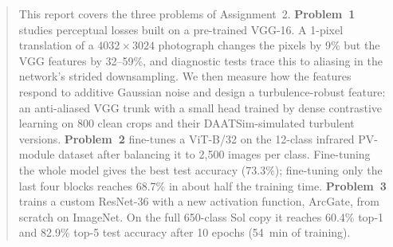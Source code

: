 \begin{abstract}
This report covers the three problems of Assignment~2.
\textbf{Problem~1} studies perceptual losses built on a pre-trained VGG-16.
A 1-pixel translation of a $4032\times3024$ photograph changes the pixels by 9\% but the VGG features by 32--59\%, and diagnostic tests trace this to aliasing in the network's strided downsampling.
We then measure how the features respond to additive Gaussian noise and design a turbulence-robust feature: an anti-aliased VGG trunk with a small head trained by dense contrastive learning on 800 clean crops and their DAATSim-simulated turbulent versions.
\textbf{Problem~2} fine-tunes a ViT-B/32 on the 12-class infrared PV-module dataset after balancing it to 2{,}500 images per class.
Fine-tuning the whole model gives the best test accuracy (73.3\%); fine-tuning only the last four blocks reaches 68.7\% in about half the training time.
\textbf{Problem~3} trains a custom ResNet-36 with a new activation function, ArcGate, from scratch on ImageNet.
On the full 650-class Sol copy it reaches 60.4\% top-1 and 82.9\% top-5 test accuracy after 10 epochs (54~min of training).
\end{abstract}

